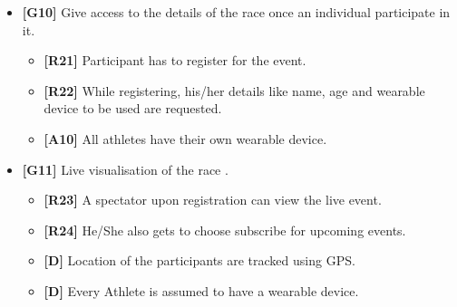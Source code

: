 \begin{itemize}
\item\textbf{[G10]} Give access to the details of the race once an individual participate in it.

\begin{itemize}
\item\textbf{[R21]} Participant has to register for the event.
\item\textbf{[R22]} While registering, his/her details like name, age and wearable device to be used are requested.
\item\textbf{[A10]} All athletes have their own wearable device.\newline
\end{itemize}

\item\textbf{[G11]} Live visualisation of the race .

\begin{itemize}
\item\textbf{[R23]} A spectator upon registration can view the live event.
\item\textbf{[R24]} He/She also gets to choose subscribe for upcoming events.
\item\textbf{[D]} Location of the participants are tracked using GPS.
\item\textbf{[D]} Every Athlete is assumed to have a wearable device.
\end{itemize}

\end{itemize}
